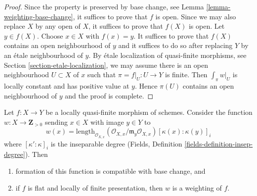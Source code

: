 \begin{proof}
Since the property is preserved by base change, see
Lemma \ref{lemma-weighting-base-change}, it suffices
to prove that $f$ is open. Since we may also replace
$X$ by any open of $X$, it suffices to prove that $f(X)$
is open. Let $y \in f(X)$. Choose $x \in X$ with $f(x) = y$.
It suffices to prove that $f(X)$ contains an open neighbourhood
of $y$ and it suffices to do so after replacing $Y$ by an
\'etale neighbourhood of $y$. By \'etale localization of
quasi-finite morphisms, see Section \ref{section-etale-localization},
we may assume
there is an open neighbourhood $U \subset X$ of $x$
such that $\pi = f|_U : U \to Y$ is finite. Then
$\int_\pi w|_U$ is locally constant and has positive value at $y$.
Hence $\pi(U)$ contains an open neighbourhood of $y$
and the proof is complete.
\end{proof}

\begin{lemma}
\label{lemma-weighting-flat-quasi-finite}
Let $f : X \to Y$ be a locally quasi-finite morphism of schemes.
Consider the function $w : X \to \mathbf{Z}_{> 0}$ sending
$x \in X$ with image $y \in Y$ to
$$
w(x) =
\text{length}_{\mathcal{O}_{X, x}}
(\mathcal{O}_{X, x}/\mathfrak m_y \mathcal{O}_{X, x})
[\kappa(x) : \kappa(y)]_i
$$
where $[\kappa' : \kappa]_i$ is the inseparable degree
(Fields, Definition \ref{fields-definition-insep-degree}). Then
\begin{enumerate}
\item formation of this function is compatible with base change, and
\item if $f$ is flat and locally of finite presentation, then
$w$ is a weighting of $f$.
\end{enumerate}
\end{lemma}

